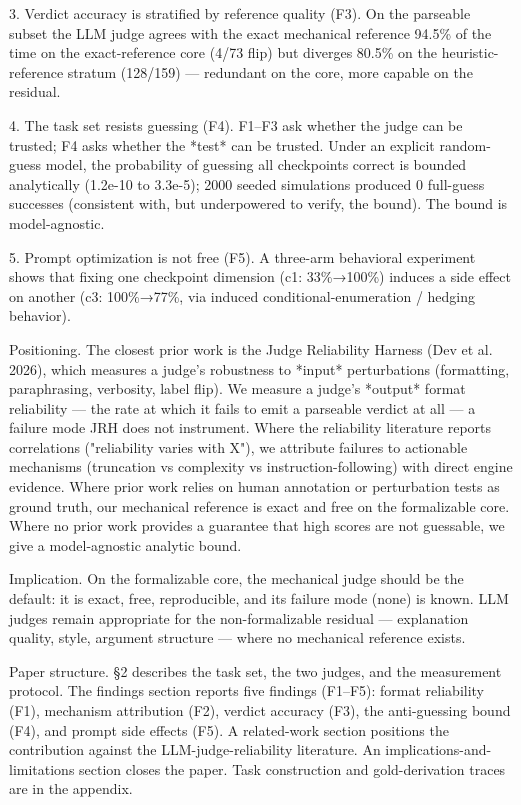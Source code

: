 \documentclass[10pt,twocolumn]{article}
\begin{document}
3. Verdict accuracy is stratified by reference quality (F3). On the parseable subset the LLM judge agrees with the exact mechanical reference 94.5\% of the time on the exact-reference core (4/73 flip) but diverges 80.5\% on the heuristic-reference stratum (128/159) — redundant on the core, more capable on the residual.


4. The task set resists guessing (F4). F1–F3 ask whether the judge can be trusted; F4 asks whether the *test* can be trusted. Under an explicit random-guess model, the probability of guessing all checkpoints correct is bounded analytically (1.2e-10 to 3.3e-5); 2000 seeded simulations produced 0 full-guess successes (consistent with, but underpowered to verify, the bound). The bound is model-agnostic.


5. Prompt optimization is not free (F5). A three-arm behavioral experiment shows that fixing one checkpoint dimension (c1: 33\%→100\%) induces a side effect on another (c3: 100\%→77\%, via induced conditional-enumeration / hedging behavior).


Positioning. The closest prior work is the Judge Reliability Harness (Dev et al. 2026), which measures a judge's robustness to *input* perturbations (formatting, paraphrasing, verbosity, label flip). We measure a judge's *output* format reliability — the rate at which it fails to emit a parseable verdict at all — a failure mode JRH does not instrument. Where the reliability literature reports correlations ("reliability varies with X"), we attribute failures to actionable mechanisms (truncation vs complexity vs instruction-following) with direct engine evidence. Where prior work relies on human annotation or perturbation tests as ground truth, our mechanical reference is exact and free on the formalizable core. Where no prior work provides a guarantee that high scores are not guessable, we give a model-agnostic analytic bound.


Implication. On the formalizable core, the mechanical judge should be the default: it is exact, free, reproducible, and its failure mode (none) is known. LLM judges remain appropriate for the non-formalizable residual — explanation quality, style, argument structure — where no mechanical reference exists.


Paper structure. §2 describes the task set, the two judges, and the measurement protocol. The findings section reports five findings (F1–F5): format reliability (F1), mechanism attribution (F2), verdict accuracy (F3), the anti-guessing bound (F4), and prompt side effects (F5). A related-work section positions the contribution against the LLM-judge-reliability literature. An implications-and-limitations section closes the paper. Task construction and gold-derivation traces are in the appendix.
\end{document}
